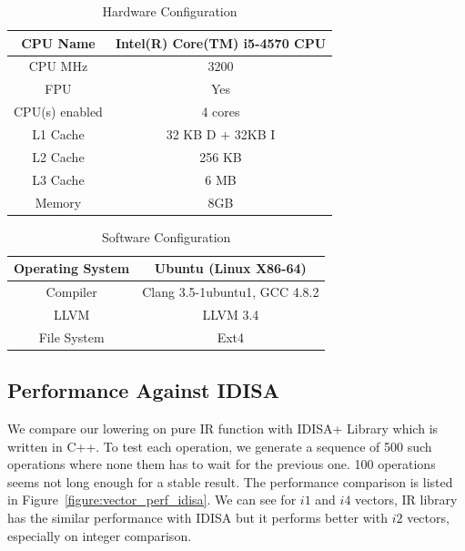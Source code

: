 \begin{table}[h]
\centering
\begin{tabular}{|c|c|}
\hline
CPU Name       & Intel(R) Core(TM) i5-4570 CPU \\ \hline
CPU MHz        & 3200                          \\ \hline
FPU            & Yes                           \\ \hline
CPU(s) enabled & 4 cores                       \\ \hline
L1 Cache       & 32 KB D + 32KB I              \\ \hline
L2 Cache       & 256 KB                        \\ \hline
L3 Cache       & 6 MB                          \\ \hline
Memory         & 8GB                           \\ \hline
\end{tabular}
\caption{Hardware Configuration}
\label{table:hardware_config}
\end{table}

\begin{table}[h]
\centering
\begin{tabular}{|c|c|}
\hline
Operating System & Ubuntu (Linux X86-64)         \\ \hline
Compiler         & Clang 3.5-1ubuntu1, GCC 4.8.2 \\ \hline
LLVM             & LLVM 3.4                      \\ \hline
File System      & Ext4                          \\ \hline
\end{tabular}
\caption{Software Configuration}
\label{table:software_config}
\end{table}

\subsection{Performance Against IDISA}
We compare our lowering on pure IR function with IDISA+ Library \cite{hua_idisa} which is written in C++. To test each operation, we generate a sequence of 500 such operations where none them has to wait for the previous one. 100 operations seems not long enough for a stable result. The performance comparison is listed in Figure~\ref{figure:vector_perf_idisa}. We can see for $i1$ and $i4$ vectors, IR library has the similar performance with IDISA but it performs better with $i2$ vectors, especially on integer comparison.

